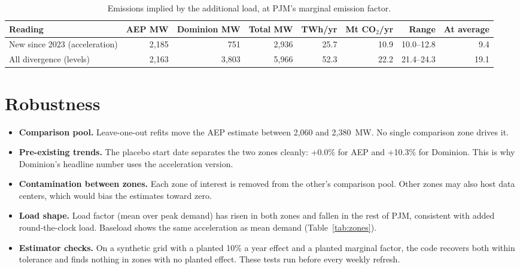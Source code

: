 \documentclass[11pt,a4paper]{article}
\begin{document}
\begin{table}[H]
\centering\footnotesize
\caption{Emissions implied by the additional load, at PJM's marginal emission factor.}\label{tab:emissions}
\begin{tabular}{lrrrrrrr}
\toprule
Reading & AEP MW & Dominion MW & Total MW & TWh/yr & Mt CO$_2$/yr & Range & At average \\
\midrule
New since 2023 (acceleration) & 2,185 & 751 & 2,936 & 25.7 & 10.9 & 10.0--12.8 & 9.4 \\
All divergence (levels) & 2,163 & 3,803 & 5,966 & 52.3 & 22.2 & 21.4--24.3 & 19.1 \\
\bottomrule
\end{tabular}
\end{table}


\section{Robustness}
\begin{itemize}
\item \textbf{Comparison pool.} Leave-one-out refits move the AEP estimate between 2,060 and 2,380~MW. No single comparison zone drives it.
\item \textbf{Pre-existing trends.} The placebo start date separates the two zones cleanly: +0.0\% for AEP and +10.3\% for Dominion. This is why Dominion's headline number uses the acceleration version.
\item \textbf{Contamination between zones.} Each zone of interest is removed from the other's comparison pool. Other zones may also host data centers, which would bias the estimates toward zero.
\item \textbf{Load shape.} Load factor (mean over peak demand) has risen in both zones and fallen in the rest of PJM, consistent with added round-the-clock load. Baseload shows the same acceleration as mean demand (Table~\ref{tab:zones}).
\item \textbf{Estimator checks.} On a synthetic grid with a planted 10\% a year effect and a planted marginal factor, the code recovers both within tolerance and finds nothing in zones with no planted effect. These tests run before every weekly refresh.
\end{itemize}
\end{document}
